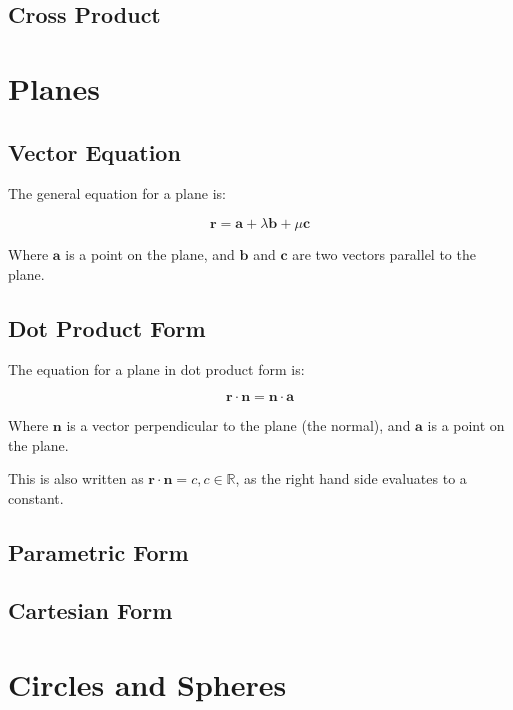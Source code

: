 \documentclass[a4paper,11pt]{article}
\newcommand{\bb}{\boldsymbol}
\begin{document}
\subsection{Cross Product}




\section{Planes}

\subsection{Vector Equation}

The general equation for a plane is:

$$
\bb{r} = \bb{a} + \lambda \bb{b} + \mu \bb{c}
$$

Where $\bb{a}$ is a point on the plane, and $\bb{b}$ and $\bb{c}$ are two
vectors parallel to the plane.


\subsection{Dot Product Form}

The equation for a plane in dot product form is:

$$
\bb{r} \cdot \bb{n} = \bb{n} \cdot \bb{a}
$$

Where $\bb{n}$ is a vector perpendicular to the plane (the normal), and $\bb{a}$
is a point on the plane.

This is also written as $\bb{r} \cdot \bb{n} = c, c \in \mathbb{R}$, as the
right hand side evaluates to a constant.


\subsection{Parametric Form}


\subsection{Cartesian Form}




\section{Circles and Spheres}
\end{document}
